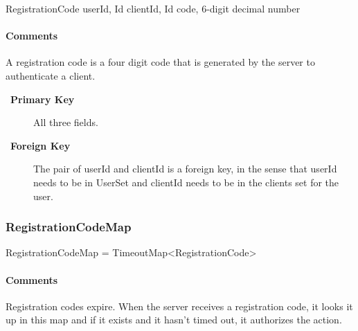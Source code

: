 \documentclass[a4paper,10pt]{article}
\let\Item\item
\newcommand\SpecialItem{\renewcommand\item[1][]{\Item[\textbullet~\bfseries##1]}
}
\begin{document}
\begin{verbbox}
RegistrationCode
{
  userId, Id
  clientId, Id
  code, 6-digit decimal number
}
\end{verbbox}
\begin{center}
\theverbbox
\end{center}

\begin{inparaitem}[ ]
 \item \infrastructure
\end{inparaitem}

\paragraph*{Comments}
A registration code is a four digit code that is generated by the server to authenticate a client.

\SpecialItem
\begin{description}
 \item[Primary Key] All three fields.
 \item[Foreign Key] The pair of userId and clientId is a foreign key, in the sense that userId needs to be in UserSet and clientId needs to be in the clients set for the user.
\end{description}

\subsubsection{RegistrationCodeMap}
\label{sec:structure:RegistrationCodeMap}

\begin{verbbox}
RegistrationCodeMap = TimeoutMap<RegistrationCode>
\end{verbbox}
\begin{center}
\theverbbox
\end{center}

\begin{inparaitem}[ ]
 \item \unique
 \item \persistent
 \item \secure
\end{inparaitem}

\paragraph*{Comments}
Registration codes expire. When the server receives a registration code, it looks it up in this map and if it exists and it hasn't timed out, it authorizes the action.
\end{document}

